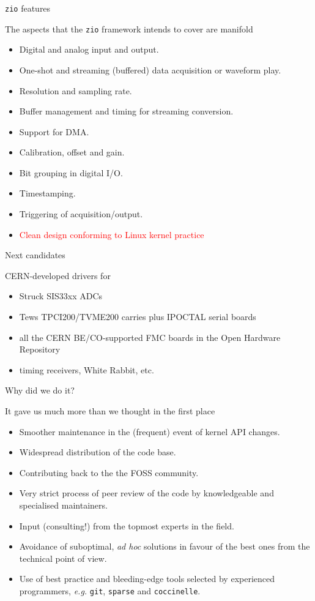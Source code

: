 \documentclass[compress,red]{beamer}
\begin{document}
\begin{frame}{\texttt{zio} features}

The aspects that the \texttt{zio} framework intends to cover are
manifold
\begin{itemize} \small
\pause\item Digital and analog input and output.
\pause\item One-shot and streaming (buffered) data acquisition or waveform play.
\pause\item Resolution and sampling rate.
\pause\item Buffer management and timing for streaming conversion.
\pause\item Support for DMA.
\pause\item Calibration, offset and gain.
\pause\item Bit grouping in digital I/O.
\pause\item Timestamping.
\pause\item Triggering of acquisition/output.
\pause\item \textcolor{red}{Clean design conforming to Linux kernel practice}
\end{itemize}
\end{frame}

\begin{frame}{Next candidates}

CERN-developed drivers for
\begin{itemize}
\pause
\item Struck SIS33xx ADCs
\pause
\item Tews TPCI200/TVME200 carries plus IPOCTAL serial boards
\pause
\item all the CERN BE/CO-supported FMC boards in the Open Hardware Repository
\pause
\item timing receivers, White Rabbit, etc.
\end{itemize}
\end{frame}

\begin{frame}{Why did we do it?}

It gave us much more than we thought in the first place
\begin{itemize}
\pause
\item Smoother maintenance in the (frequent) event of kernel API
  changes.
\item Widespread distribution of the code base.
\item Contributing back to the the FOSS community.
\pause \color{red}
\item Very strict process of peer review of the code by knowledgeable
    and specialised maintainers.
\pause
\item Input (consulting!) from the topmost experts in the field.
\pause
\item Avoidance of suboptimal, \emph{ad hoc} solutions in favour of the
    best ones from the technical point of view.
\pause
\item Use of best practice and bleeding-edge tools selected by
    experienced programmers, \emph{e.g.} \texttt{git}, \texttt{sparse}
    and \texttt{coccinelle}.
\end{itemize}
\end{frame}
\end{document}
